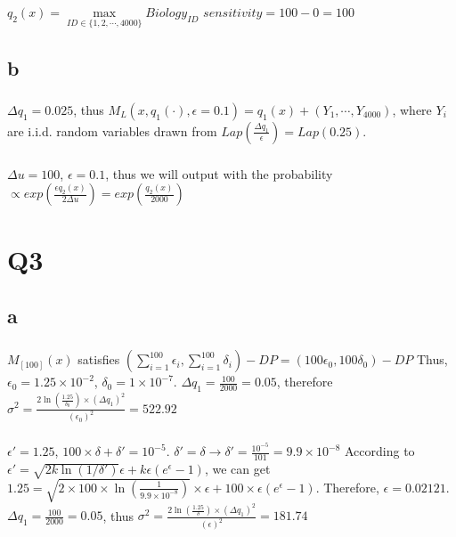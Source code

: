 \documentclass[12pt]{article}
\begin{document}
\subsubsection{}
$q_2(x)=\max\limits_{ID\in \{1,2,\cdots,4000\}}Biology_{ID}$
\newline
$sensitivity=100-0=100$
\subsection{b}
\subsubsection{}
$\Delta q_1=0.025$, thus $M_L(x, q_1(\cdot), \epsilon=0.1)=q_1(x)+(Y_1,\cdots, Y_{4000})$, where $Y_i$ are i.i.d. random variables drawn from $Lap(\frac{\Delta q_1}{\epsilon})=Lap(0.25)$.
\subsubsection{}
$\Delta u=100$, $\epsilon=0.1$, thus we will output with the probability $\propto exp(\frac{\epsilon q_2(x)}{2\Delta u})=exp(\frac{q_2(x)}{2000})$

\section{Q3}
\subsection{a}
\subsubsection{}
$M_{[100]}(x)$ satisfies $(\sum\limits_{i=1}^{100}\epsilon_i, \sum\limits_{i=1}^{100}\delta_i)-DP=(100\epsilon_0 ,100\delta_0)-DP$
\newline
Thus, $\epsilon_0=1.25\times 10^{-2}$, $\delta_0=1\times 10^{-7}$. $\Delta q_1=\frac{100}{2000}=0.05$, therefore $\sigma^2=\frac{2\ln (\frac{1.25}{\delta_0})\times (\Delta q_1)^2}{(\epsilon_0)^2}=522.92$
\subsubsection{}
$\epsilon '=1.25$, $100\times \delta+\delta '=10^{-5}$. $\delta '=\delta\rightarrow\delta '=\frac{10^{-5}}{101}=9.9\times 10^{-8}$
\newline
According to $\epsilon '=\sqrt{2k\ln (1/\delta ')}\epsilon+k\epsilon(e^\epsilon-1)$, we can get $1.25=\sqrt{2\times 100\times\ln (\frac{1}{9.9\times 10^{-8}})}\times \epsilon+100\times \epsilon (e^{\epsilon}-1)$. Therefore, $\epsilon=0.02121$. $\Delta q_1=\frac{100}{2000}=0.05$, thus $\sigma^2=\frac{2\ln (\frac{1.25}{\delta})\times (\Delta q_1)^2}{(\epsilon)^2}=181.74$
\end{document}
